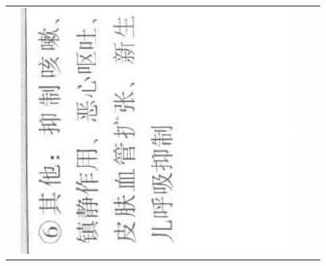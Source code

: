\documentclass[10pt]{article}
\begin{document}
\begin{center}
\begin{tabular}{|c|c|c|c|}
 & \includegraphics[max width=\textwidth]{2024_07_05_645bb794a4d4f32ee0c8g-332(13)}

\end{tabular}
\end{center}
\end{document}
